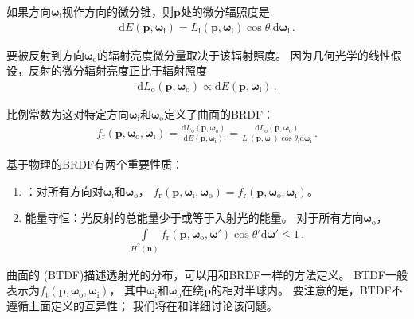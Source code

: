 如果方向${\bm\omega}_{\mathrm{i}}$视作方向的微分锥，则$\bm p$处的微分辐照度是
\begin{align}\label{eq:5.7}
    \mathrm{d}E({\bm p},{\bm\omega}_{\mathrm{i}})=L_{\mathrm{i}}({\bm p},{\bm\omega}_{\mathrm{i}})\cos\theta_{\mathrm{i}}\mathrm{d}{\bm\omega}_{\mathrm{i}}\, .
\end{align}

要被反射到方向${\bm\omega}_{\mathrm{o}}$的辐射亮度微分量取决于该辐射照度。
因为几何光学的线性假设，反射的微分辐射亮度正比于辐射照度
\begin{align*}
    \mathrm{d}L_{\mathrm{o}}({\bm p},{\bm\omega}_{\mathrm{o}})\propto\mathrm{d}E({\bm p},{\bm\omega}_{\mathrm{i}})\, .
\end{align*}

比例常数为这对特定方向${\bm\omega}_{\mathrm{i}}$和${\bm\omega}_{\mathrm{o}}$定义了曲面的BRDF：
\begin{align}\label{eq:5.8}
    f_{\mathrm{r}}({\bm p},{\bm \omega}_\mathrm{o},{\bm \omega}_\mathrm{i})=\frac{\mathrm{d}L_{\mathrm{o}}({\bm p},{\bm\omega}_{\mathrm{o}})}{\mathrm{d}E({\bm p},{\bm\omega}_{\mathrm{i}})}=\frac{\mathrm{d}L_{\mathrm{o}}({\bm p},{\bm\omega}_{\mathrm{o}})}{L_{\mathrm{i}}({\bm p},{\bm\omega}_{\mathrm{i}})\cos\theta_{\mathrm{i}}\mathrm{d}{\bm\omega}_{\mathrm{i}}}\, .
\end{align}

基于物理的BRDF有两个重要性质：
\begin{enumerate}
    \item {}：对所有方向对${\bm\omega}_{\mathrm{i}}$和${\bm\omega}_{\mathrm{o}}$，
          $f_{\mathrm{r}}({\bm p},{\bm \omega}_\mathrm{i},{\bm \omega}_\mathrm{o})=f_{\mathrm{r}}({\bm p},{\bm \omega}_\mathrm{o},{\bm \omega}_\mathrm{i})$。
    \item {\sffamily 能量守恒}：光反射的总能量少于或等于入射光的能量。
          对于所有方向${\bm\omega}_{\mathrm{o}}$，
          \begin{align*}
              \int\limits_{H^2({\bm n})}f_{\mathrm{r}}({\bm p},{\bm \omega}_\mathrm{o},{\bm \omega}')\cos\theta'\mathrm{d}{\bm\omega}'\le1\, .
          \end{align*}
\end{enumerate}

曲面的
(BTDF)描述透射光的分布，可以用和BRDF一样的方法定义。
BTDF一般表示为$f_{\mathrm{t}}({\bm p},{\bm \omega}_\mathrm{o},{\bm \omega}_\mathrm{i})$，
其中${\bm\omega}_{\mathrm{i}}$和${\bm\omega}_{\mathrm{o}}$在绕$\bm p$的相对半球内。
要注意的是，BTDF不遵循上面定义的互异性；
我们将在和详细讨论该问题。

